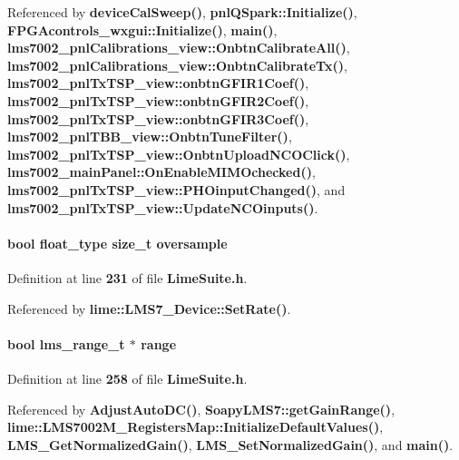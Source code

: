 Referenced by {\bf device\+Cal\+Sweep()}, {\bf pnl\+Q\+Spark\+::\+Initialize()}, {\bf F\+P\+G\+Acontrols\+\_\+wxgui\+::\+Initialize()}, {\bf main()}, {\bf lms7002\+\_\+pnl\+Calibrations\+\_\+view\+::\+Onbtn\+Calibrate\+All()}, {\bf lms7002\+\_\+pnl\+Calibrations\+\_\+view\+::\+Onbtn\+Calibrate\+Tx()}, {\bf lms7002\+\_\+pnl\+Tx\+T\+S\+P\+\_\+view\+::onbtn\+G\+F\+I\+R1\+Coef()}, {\bf lms7002\+\_\+pnl\+Tx\+T\+S\+P\+\_\+view\+::onbtn\+G\+F\+I\+R2\+Coef()}, {\bf lms7002\+\_\+pnl\+Tx\+T\+S\+P\+\_\+view\+::onbtn\+G\+F\+I\+R3\+Coef()}, {\bf lms7002\+\_\+pnl\+T\+B\+B\+\_\+view\+::\+Onbtn\+Tune\+Filter()}, {\bf lms7002\+\_\+pnl\+Tx\+T\+S\+P\+\_\+view\+::\+Onbtn\+Upload\+N\+C\+O\+Click()}, {\bf lms7002\+\_\+main\+Panel\+::\+On\+Enable\+M\+I\+M\+Ochecked()}, {\bf lms7002\+\_\+pnl\+Tx\+T\+S\+P\+\_\+view\+::\+P\+H\+Oinput\+Changed()}, and {\bf lms7002\+\_\+pnl\+Tx\+T\+S\+P\+\_\+view\+::\+Update\+N\+C\+Oinputs()}.

\paragraph[{oversample}]{\setlength{\rightskip}{0pt plus 5cm}bool {\bf float\+\_\+type} size\+\_\+t oversample}\label{group__FN__HIGH__LVL_ga374b0fae227f9f4e513a37dc8131c37c}


Definition at line {\bf 231} of file {\bf Lime\+Suite.\+h}.



Referenced by {\bf lime\+::\+L\+M\+S7\+\_\+\+Device\+::\+Set\+Rate()}.

\paragraph[{range}]{\setlength{\rightskip}{0pt plus 5cm}bool {\bf lms\+\_\+range\+\_\+t} $\ast$ range}\label{group__FN__HIGH__LVL_ga74d7bbee9e00069f4c5248ad2573d086}


Definition at line {\bf 258} of file {\bf Lime\+Suite.\+h}.



Referenced by {\bf Adjust\+Auto\+D\+C()}, {\bf Soapy\+L\+M\+S7\+::get\+Gain\+Range()}, {\bf lime\+::\+L\+M\+S7002\+M\+\_\+\+Registers\+Map\+::\+Initialize\+Default\+Values()}, {\bf L\+M\+S\+\_\+\+Get\+Normalized\+Gain()}, {\bf L\+M\+S\+\_\+\+Set\+Normalized\+Gain()}, and {\bf main()}.

